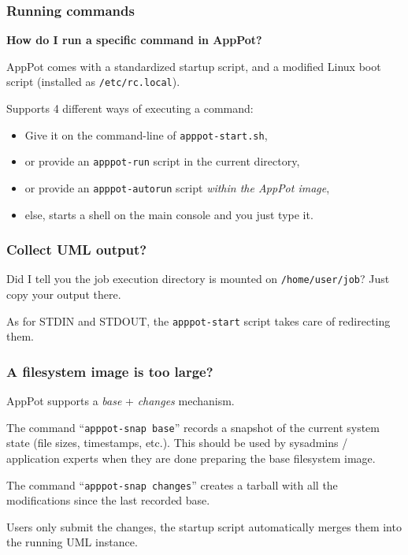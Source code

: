 \documentclass{beamer}
\begin{document}
\begin{frame}
  \frametitle{Running commands}
  \label{sec:13}
  \textbf{How do I run a specific command in AppPot?}

  \+
  AppPot comes with a standardized startup script, and a modified
  Linux boot script (installed as \texttt{/etc/rc.local}).

  \+
  Supports 4 different ways of executing a command:
  \begin{itemize}
  \item Give it on the command-line of \texttt{apppot-start.sh},
  \item or provide an \texttt{apppot-run} script in the current directory,
  \item or provide an \texttt{apppot-autorun} script \emph{within the AppPot image},
  \item else, starts a shell on the main console and you just type it.
  \end{itemize}
\end{frame}


\begin{frame}
  \frametitle{Collect UML output?}
  \label{sec:16}
  Did I tell you the job execution directory is mounted on
  \texttt{/home/user/job}? Just copy your output there.

  \+
  As for STDIN and STDOUT, the \texttt{apppot-start} script takes care of
  redirecting them.
\end{frame}


\begin{frame}
  \frametitle{A filesystem image is too large?}
  \label{sec:15}
  AppPot supports a \emph{base} + \emph{changes} mechanism.

  \+
  The command ``\texttt{apppot-snap base}'' records a snapshot of the current
  system state (file sizes, timestamps, etc.).  This should be used by
  sysadmins / application experts when they are done preparing the
  base filesystem image.

  \+
  The command ``\texttt{apppot-snap changes}'' creates a tarball with all the
  modifications since the last recorded base.

  \+
  Users only submit the changes, the startup script automatically
  merges them into the running UML instance.
\end{frame}
\end{document}
